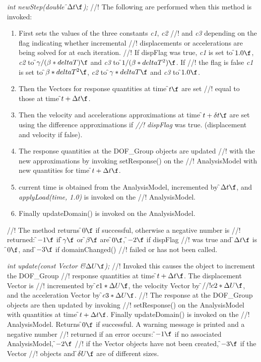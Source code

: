 {\em int newStep(double \f$\Delta t\f$);}
//! The following are performed when this method is invoked:
\begin{enumerate}
\item First sets the values of the three constants {\em c1}, {\em c2}
//! and {\em c3} depending on the flag indicating whether incremental
//! displacements or accelerations are being solved for at each iteration.
//! If \p dispFlag was \p true, {\em c1} is set to \f$1.0\f$, {\em c2} to \f$
\gamma / (\beta * deltaT)\f$ and {\em c3} to \f$1/ (\beta * deltaT^2)\f$. If
//! the flag is \p false {\em c1} is set to \f$\beta * deltaT^2\f$, {\em c2} to \f$
\gamma * deltaT\f$ and {\em c3} to \f$1.0\f$. 
\item Then the Vectors for response quantities at time \f$t\f$ are set
//! equal to those at time \f$t + \Delta t\f$.
\item Then the velocity and accelerations approximations at time \f$t +
\delta t\f$ are set using the difference approximations if {\em
//! dispFlag} was \p true. (displacement and velocity if \p false).
\item The response quantities at the DOF\_Group objects are updated
//! with the new approximations by invoking setResponse() on the
//! AnalysisModel with new quantities for time \f$t + \Delta t\f$.
\item current time is obtained from the AnalysisModel, incremented by
\f$\Delta t\f$, and {\em applyLoad(time, 1.0)} is invoked on the
//! AnalysisModel. 
\item Finally updateDomain() is invoked on the AnalysisModel.
\end{enumerate}
//! The method returns \f$0\f$ if successful, otherwise a negative number is
//! returned: \f$-1\f$ if \f$\gamma\f$ or \f$\beta\f$ are \f$0\f$, \f$-2\f$ if \p dispFlag
//! was true and \f$\Delta t\f$ is \f$0\f$, and \f$-3\f$ if domainChanged()
//! failed or has not been called.

{\em int update(const Vector \&\f$\Delta U\f$);}
//! Invoked this causes the object to increment the DOF\_Group
//! response quantities at time \f$t + \Delta t\f$. The displacement Vector is  
//! incremented by \f$ c1 * \Delta U\f$, the velocity Vector by \f$
//! c2 * \Delta U\f$, and the acceleration Vector by \f$c3 * \Delta U\f$. 
//! The response at the DOF\_Group objects are then updated by invoking
//! setResponse() on the AnalysisModel with quantities at time \f$t +
\Delta t\f$. Finally updateDomain() is invoked on the
//! AnalysisModel. Returns
\f$0\f$ if successful. A warning message is printed and a negative number
//! returned if an error occurs: \f$-1\f$ if no associated AnalysisModel, \f$-2\f$
//! if the Vector objects have not been created, \f$-3\f$ if the Vector
//! objects and \f$\delta U\f$ are of different sizes.

